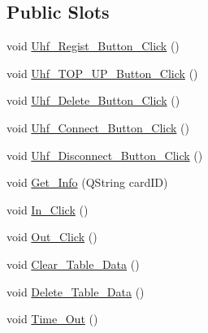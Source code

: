 \subsection*{Public Slots}
\begin{DoxyCompactItemize}
\item 
void \mbox{\hyperlink{class_widget_aaa7751b71135c9c841b9036d25570134}{Uhf\+\_\+\+Regist\+\_\+\+Button\+\_\+\+Click}} ()
\item 
void \mbox{\hyperlink{class_widget_aeec0c7444513091532005eef26048a91}{Uhf\+\_\+\+T\+O\+P\+\_\+\+U\+P\+\_\+\+Button\+\_\+\+Click}} ()
\item 
void \mbox{\hyperlink{class_widget_a6ef0cb76aab26c216bdd0584d32bdd1d}{Uhf\+\_\+\+Delete\+\_\+\+Button\+\_\+\+Click}} ()
\item 
void \mbox{\hyperlink{class_widget_acceb5443a97ee9023250cda33f183bef}{Uhf\+\_\+\+Connect\+\_\+\+Button\+\_\+\+Click}} ()
\item 
void \mbox{\hyperlink{class_widget_a0186f9125495a90a0166280d932ae831}{Uhf\+\_\+\+Disconnect\+\_\+\+Button\+\_\+\+Click}} ()
\item 
void \mbox{\hyperlink{class_widget_a25fcbea5c404362947c24794373a0968}{Get\+\_\+\+Info}} (Q\+String card\+ID)
\item 
void \mbox{\hyperlink{class_widget_a9dc8ecbea303faeb17e08ef888754cf9}{In\+\_\+\+Click}} ()
\item 
void \mbox{\hyperlink{class_widget_a5ba1dc5f780dea723837e22b819a769e}{Out\+\_\+\+Click}} ()
\item 
void \mbox{\hyperlink{class_widget_a6fc213aa66cf58f876e117af46f6aa0a}{Clear\+\_\+\+Table\+\_\+\+Data}} ()
\item 
void \mbox{\hyperlink{class_widget_a0e7b4792c1f760b129a08ac63107a018}{Delete\+\_\+\+Table\+\_\+\+Data}} ()
\item 
void \mbox{\hyperlink{class_widget_ab0e14fcdbe3b8a8541160d01f0eef979}{Time\+\_\+\+Out}} ()
\end{DoxyCompactItemize}
